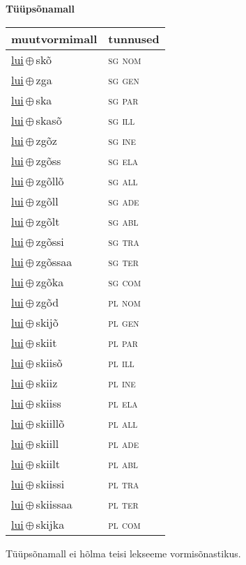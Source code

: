 

\vspace{3.5em}
\noindent \begin{minipage}{\textwidth}
\noindent \textbf{Tüüpsõnamall \,}\\

\begin{sideways}
\begin{tabular}{l l}
muutvormimall & tunnused \\
\hline
\underline{lui}\,$\oplus$\,skõ & \textsc{ sg nom } \\
\underline{lui}\,$\oplus$\,zga & \textsc{ sg gen } \\
\underline{lui}\,$\oplus$\,ska & \textsc{ sg par } \\
\underline{lui}\,$\oplus$\,skasõ & \textsc{ sg ill } \\
\underline{lui}\,$\oplus$\,zgõz & \textsc{ sg ine } \\
\underline{lui}\,$\oplus$\,zgõss & \textsc{ sg ela } \\
\underline{lui}\,$\oplus$\,zgõllõ & \textsc{ sg all } \\
\underline{lui}\,$\oplus$\,zgõll & \textsc{ sg ade } \\
\underline{lui}\,$\oplus$\,zgõlt & \textsc{ sg abl } \\
\underline{lui}\,$\oplus$\,zgõssi & \textsc{ sg tra } \\
\underline{lui}\,$\oplus$\,zgõssaa & \textsc{ sg ter } \\
\underline{lui}\,$\oplus$\,zgõka & \textsc{ sg com } \\
\underline{lui}\,$\oplus$\,zgõd & \textsc{ pl nom } \\
\underline{lui}\,$\oplus$\,skijõ & \textsc{ pl gen } \\
\underline{lui}\,$\oplus$\,skiit & \textsc{ pl par } \\
\underline{lui}\,$\oplus$\,skiisõ & \textsc{ pl ill } \\
\underline{lui}\,$\oplus$\,skiiz & \textsc{ pl ine } \\
\underline{lui}\,$\oplus$\,skiiss & \textsc{ pl ela } \\
\underline{lui}\,$\oplus$\,skiillõ & \textsc{ pl all } \\
\underline{lui}\,$\oplus$\,skiill & \textsc{ pl ade } \\
\underline{lui}\,$\oplus$\,skiilt & \textsc{ pl abl } \\
\underline{lui}\,$\oplus$\,skiissi & \textsc{ pl tra } \\
\underline{lui}\,$\oplus$\,skiissaa & \textsc{ pl ter } \\
\underline{lui}\,$\oplus$\,skijka & \textsc{ pl com } \\
\end{tabular}
\end{sideways}
\label{tab:tüüpsõnamall-luiskõ}

\end{minipage}

 
\vspace{1em}
\noindent Tüüpsõnamall  ei hõlma teisi lekseeme vormi\-sõnastikus.
